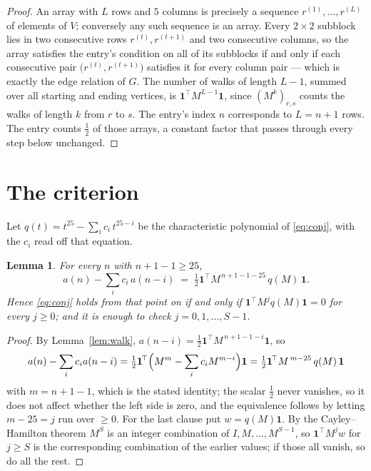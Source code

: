 \documentclass[11pt,a4paper]{article}
\theoremstyle{plain}
\newtheorem{lemma}[theorem]{Lemma}
\theoremstyle{definition}
\begin{document}
\begin{proof}
An array with $L$ rows and $5$ columns is precisely a sequence
$r^{(1)},\dots,r^{(L)}$ of elements of $V$; conversely any such sequence is an array.
Every $2\times2$ subblock lies in two consecutive rows $r^{(t)},r^{(t+1)}$ and two
consecutive columns, so the array satisfies the entry's condition on all of its subblocks
if and only if each consecutive pair $\bigl(r^{(t)},r^{(t+1)}\bigr)$ satisfies it for
every column pair --- which is exactly the edge relation of $G$. The number of walks of
length $L-1$, summed over all starting and ending vertices, is
$\mathbf{1}^{\!\top}M^{L-1}\mathbf{1}$, since $(M^{k})_{r,s}$ counts the walks of
length $k$ from $r$ to $s$. The entry's index $n$ corresponds to $L=n+1$ rows. The entry counts $\tfrac1{2}$ of those arrays, a constant factor that passes through every step below unchanged.
\end{proof}

\section{The criterion}

Let $q(t)=t^{25}-\sum_i c_i\,t^{25-i}$ be the characteristic polynomial of
\eqref{eq:conj}, with the $c_i$ read off that equation.

\begin{lemma}\label{lem:crit}
For every $n$ with $n+1-1\ge25$,
\[
a(n)-\sum_i c_i\,a(n-i)\;=\;\tfrac1{2}\mathbf{1}^{\!\top}M^{\,n+1-1-25}\,q(M)\,\mathbf{1} .
\]
Hence \eqref{eq:conj} holds from that point on if and only if
$\mathbf{1}^{\!\top}M^{j}q(M)\mathbf{1}=0$ for every $j\ge0$; and it is enough to check
$j=0,1,\dots,S-1$.
\end{lemma}

\begin{proof}
By Lemma~\ref{lem:walk}, $a(n-i)=\tfrac1{2}\mathbf{1}^{\!\top}M^{\,n+1-1-i}\mathbf{1}$, so
\[
a(n)-\sum_i c_i a(n-i)
=\tfrac1{2}\mathbf{1}^{\!\top}\Bigl(M^{m}-\sum_i c_i M^{m-i}\Bigr)\mathbf{1}
=\tfrac1{2}\mathbf{1}^{\!\top}M^{\,m-25}\,q(M)\,\mathbf{1}
\]
with $m=n+1-1$, which is the stated identity; the scalar $\tfrac1{2}$ never vanishes, so it does not affect whether the left side is zero, and the equivalence follows by letting
$m-25=j$ run over $\ge0$. For the last clause put $w=q(M)\mathbf{1}$. By the
Cayley--Hamilton theorem $M^{S}$ is an integer combination of $I,M,\dots,M^{S-1}$, so
$\mathbf{1}^{\!\top}M^{j}w$ for $j\ge S$ is the corresponding combination of the earlier
values; if those all vanish, so do all the rest.
\end{proof}
\end{document}
